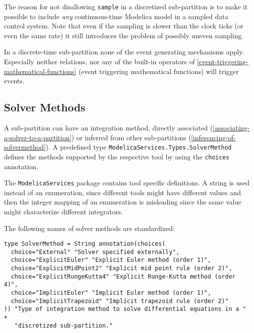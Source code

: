 \begin{nonnormative}
The reason for not disallowing \lstinline!sample! in a discretized sub-partition is to make it possible to include \emph{any} continuous-time Modelica model in a sampled data control system.
Note that even if the sampling is slower than the clock ticks (or even the same rate) it still introduces the problem of possibly uneven sampling.
\end{nonnormative}

In a discrete-time sub-partition none of the event generating mechanisms apply.
Especially neither relations, nor any of the built-in operators of \cref{event-triggering-mathematical-functions} (event triggering mathematical functions) will trigger events.

\subsection{Solver Methods}\label{solver-methods}

A sub-partition can have an integration method, directly associated (\cref{associating-a-solver-to-a-partition}) or inferred from other sub-partitions (\cref{inferencing-of-solvermethod}).
A predefined type \lstinline!ModelicaServices.Types.SolverMethod! defines the methods supported by the respective tool by using the \lstinline!choices! annotation.

\begin{nonnormative}
The \lstinline!ModelicaServices! package contains tool specific definitions.
A string is used instead of an enumeration, since different tools might have different values and then the integer mapping of an enumeration is misleading since the same value might characterize different integrators.
\end{nonnormative}

The following names of solver methods are standardized:
\begin{lstlisting}[language=modelica]
type SolverMethod = String annotation(choices(
  choice="External" "Solver specified externally",
  choice="ExplicitEuler" "Explicit Euler method (order 1)",
  choice="ExplicitMidPoint2" "Explicit mid point rule (order 2)",
  choice="ExplicitRungeKutta4" "Explicit Runge-Kutta method (order 4)",
  choice="ImplicitEuler" "Implicit Euler method (order 1)",
  choice="ImplicitTrapezoid" "Implicit trapezoid rule (order 2)"
)) "Type of integration method to solve differential equations in a " +
   "discretized sub-partition."
\end{lstlisting}

